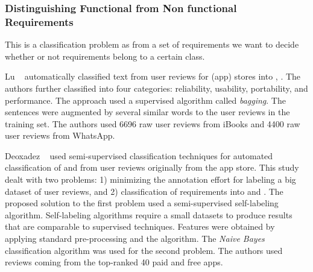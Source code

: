 \subsubsection{Distinguishing Functional from Non functional Requirements}

This
is a classification problem as from a set of requirements we want to decide
whether or not requirements belong to a certain class. 

Lu \etal~\cite{Lu:2017} automatically classified text from user reviews for
(app) stores into \FRs, \NFRs. The authors further classified \NFRs
into four categories: reliability, usability, portability, and
performance. The approach used a supervised algorithm called
\emph{bagging}. The sentences were augmented by several
similar words to the user reviews in the training set. The authors
used 6696 raw user reviews from iBooks and 4400 raw user reviews from WhatsApp.

Deoxadez \etal~\cite{Deocadez:2017} used semi-supervised classification
techniques for automated classification of \FR and \NFR from user reviews
originally from the app store. This study dealt with two problems: 1) minimizing
the annotation effort for labeling a big dataset of user reviews, and 2)
classification of requirements into \FR and \NFR. The proposed solution to the
first problem used a semi-supervised self-labeling algorithm. Self-labeling algorithms require a
small datasets to produce results that are comparable to supervised techniques.
Features were obtained by applying standard pre-processing and the \BOW
algorithm. The \emph{Naive Bayes} classification algorithm was used for the
second problem. The authors used reviews coming from the top-ranked 40 paid and
free apps.

